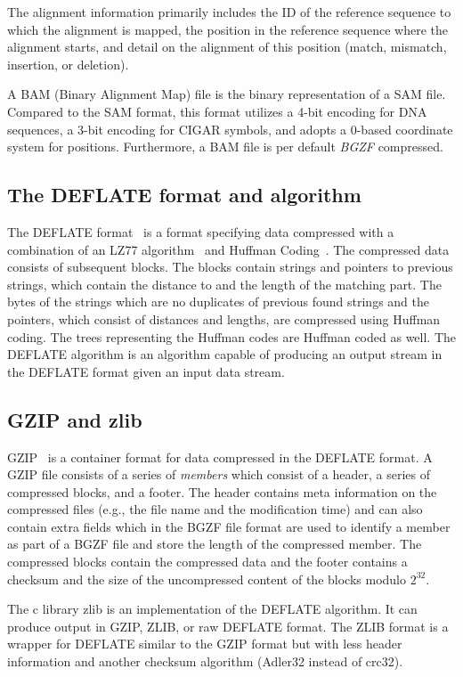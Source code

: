 The alignment information primarily includes the ID of the reference sequence to which the alignment is mapped, the position in the reference sequence where the alignment starts, and detail on the alignment of this position (match, mismatch, insertion, or deletion). 

A BAM (Binary Alignment Map) file is the binary representation of a SAM file. Compared to the SAM format, this format utilizes a 4-bit encoding for DNA sequences, a 3-bit encoding for CIGAR symbols, and adopts a 0-based coordinate system for positions. Furthermore, a BAM file is per default \textit{BGZF} compressed.

\subsection{The DEFLATE format and algorithm}
The DEFLATE format~\cite{deflate} is a format specifying data compressed with a combination of an LZ77 algorithm~\cite{ziv_universal_1977} and Huffman Coding~\cite{huffman_method_1952}. The compressed data consists of subsequent blocks. The blocks contain strings and pointers to previous strings, which contain the distance to and the length of the matching part. The bytes of the strings which are no duplicates of previous found strings and the pointers, which consist of distances and lengths, are compressed using Huffman coding. The trees representing the Huffman codes are Huffman coded as well. 
The DEFLATE algorithm is an algorithm capable of producing an output stream in the DEFLATE format given an input data stream.

\subsection{GZIP and zlib}
GZIP~\cite{gzip} is a container format for data compressed in the DEFLATE format. A GZIP file consists of a series of \textit{members} which consist of a header, a series of compressed blocks, and a footer. The header contains meta information on the compressed files (e.g., the file name and the modification time) and can also contain extra fields which in the BGZF file format are used to identify a member as part of a BGZF file and store the length of the compressed member. The compressed blocks contain the compressed data and the footer contains a checksum and the size of the uncompressed content of the blocks modulo $2^{32}$. 

The c library zlib is an implementation of the DEFLATE algorithm. It can produce output in GZIP, ZLIB, or raw DEFLATE format. The ZLIB format is a wrapper for DEFLATE similar to the GZIP format but with less header information and another checksum algorithm (Adler32 instead of crc32).



